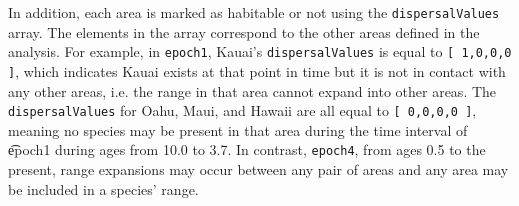 In addition, each area is marked as habitable or not using the {\tt dispersalValues} array.
The elements in the array correspond to the other areas defined in the analysis.
For example, in {\tt epoch1}, Kauai's {\tt dispersalValues} is equal to {\tt [ 1,0,0,0 ]}, which indicates Kauai exists at that point in time but it is not in contact with any other areas, i.e. the range in that area cannot expand into other areas.
The {\tt dispersalValues} for Oahu, Maui, and Hawaii are all equal to {\tt [ 0,0,0,0 ]}, meaning no species may be present in that area during the time interval of {\t epoch1} during ages from 10.0 to 3.7. In contrast, {\tt epoch4}, from ages 0.5 to the present, range expansions may occur between any pair of areas and any area may be included in a species' range.



%
%
